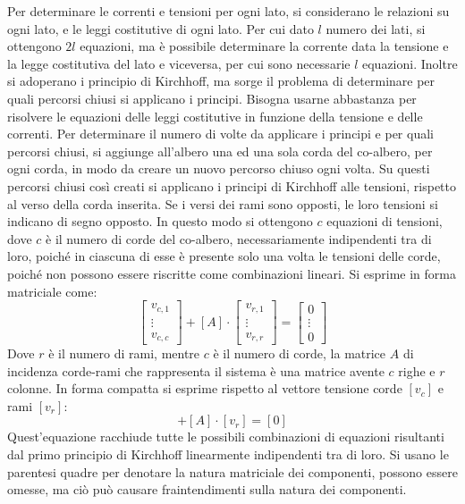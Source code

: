 \documentclass{article}
\numberwithin{equation}{subsection}
\begin{document}
Per determinare le correnti e tensioni per ogni lato, si considerano le relazioni su ogni lato, e le leggi costitutive di ogni lato. Per cui dato $l$ numero dei lati, si 
ottengono $2l$ equazioni, ma è possibile determinare la corrente data la tensione e la legge costitutiva del lato e viceversa, per cui sono necessarie $l$ equazioni. 
Inoltre si adoperano i principio di Kirchhoff, ma sorge il problema di determinare per quali percorsi chiusi si applicano i principi. Bisogna usarne abbastanza per risolvere le 
equazioni delle leggi costitutive in funzione della tensione e delle correnti. Per determinare il numero di volte da applicare i principi e per quali percorsi chiusi, si 
aggiunge all'albero una ed una sola corda del co-albero, per ogni corda, in modo da creare un nuovo percorso chiuso ogni volta. Su questi percorsi chiusi così creati si 
applicano i principi di Kirchhoff alle tensioni, rispetto al verso della corda inserita. Se i versi dei rami sono opposti, le loro tensioni si indicano di segno opposto. 
In questo modo si ottengono $c$ equazioni di tensioni, dove $c$ è il numero di corde del co-albero, necessariamente indipendenti tra di loro, poiché in ciascuna di esse è 
presente solo una volta le tensioni delle corde, poiché non possono essere riscritte come combinazioni lineari. Si esprime in forma matriciale come:
\begin{equation*}
    \begin{bmatrix}
        v_{c,1}\\
        \vdots\\
        v_{c,c}
    \end{bmatrix}+[A]\cdot\begin{bmatrix}
        v_{r,1}\\
        \vdots\\
        v_{r,r}
    \end{bmatrix}=
    \begin{bmatrix}
        0\\
        \vdots\\
        0
    \end{bmatrix}
\end{equation*}
Dove $r$ è il numero di rami, mentre $c$ è il numero di corde, la matrice $A$ di incidenza corde-rami che rappresenta il sistema è una matrice avente $c$ righe e $r$ colonne. 
In forma compatta si esprime rispetto al vettore tensione corde $[v_c]$ e rami $[v_r]$:
\begin{equation*}
    [v_c]+[A]\cdot[v_r]=[0]
\end{equation*}
Quest'equazione racchiude tutte le possibili combinazioni di equazioni risultanti dal primo principio di Kirchhoff linearmente indipendenti tra di loro. 
Si usano le parentesi quadre per denotare la natura matriciale dei componenti, possono essere omesse, ma ciò può causare fraintendimenti sulla natura dei componenti. 
\end{document}
